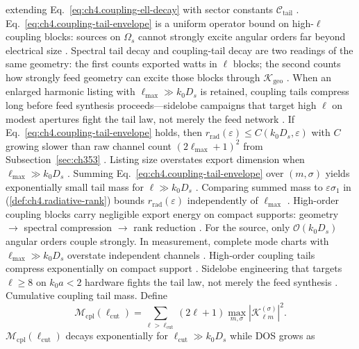 extending Eq.~\eqref{eq:ch4.coupling-ell-decay} with sector constants \(\mathcal{C}_{\mathrm{tail}}\)
\cite{hansen1988}. Eq.~\eqref{eq:ch4.coupling-tail-envelope} is a uniform operator bound on high-$\ell$ coupling blocks: sources on $\Omega_s$ cannot strongly excite angular orders far beyond electrical size \cite{harrington2001}.
Spectral tail decay and coupling-tail decay are two readings of the same geometry: the first counts exported watts in $\ell$ blocks; the second counts how strongly feed geometry can excite those blocks through $\boldsymbol{\mathcal{K}}_{\mathrm{geo}}$ \cite{hansen1988}. When an enlarged harmonic listing with $\ell_{\max}\gg k_0 D_s$ is retained, coupling tails compress long before feed synthesis proceeds---sidelobe campaigns that target high $\ell$ on modest apertures fight the tail law, not merely the feed network \cite{chu1948}.
\label{thm:ch4.coupling-tail-compression}
If Eq.~\eqref{eq:ch4.coupling-tail-envelope} holds, then
\(r_{\mathrm{rad}}(\varepsilon)\le C(k_{0}D_{s},\varepsilon)\) with \(C\) growing slower than raw channel count \((2\ell_{\max}+1)^{2}\)
from Subsection~\ref{sec:ch353} \cite{hansen1988}. Listing size overstates export dimension when
\(\ell_{\max}\gg k_{0}D_{s}\) \cite{devaney2004}.
Summing Eq.~\eqref{eq:ch4.coupling-tail-envelope} over \((m,\sigma)\) yields exponentially small tail mass for \(\ell\gg k_{0}D_{s}\)
\cite{hansen1988}. Comparing summed mass to \(\varepsilon\sigma_{1}\) in (\ref{def:ch4.radiative-rank}) bounds
\(r_{\mathrm{rad}}(\varepsilon)\) independently of \(\ell_{\max}\) \cite{harrington2001}.
High-order coupling blocks carry negligible export energy on compact supports: geometry $\to$ spectral compression $\to$ rank reduction \cite{hansen1988}. For the source, only $\mathcal{O}(k_{0}D_{s})$ angular orders couple strongly. In measurement, complete mode charts with $\ell_{\max}\gg k_{0}D_{s}$ overstate independent channels \cite{harrington2001}.
High-order coupling tails compress exponentially on compact support \cite{hansen1988}. Sidelobe engineering that targets $\ell\ge 8$ on $k_0 a<2$ hardware fights the tail law, not merely the feed synthesis \cite{stratton1941}.
Cumulative coupling tail mass. Define
\begin{equation}
\label{eq:ch4.coupling-tail-mass}
\mathcal{M}_{\mathrm{cpl}}(\ell_{\mathrm{cut}})=\sum_{\ell>\ell_{\mathrm{cut}}}(2\ell+1)\max_{m,\sigma}|\mathcal{K}_{\ell m}^{(\sigma)}|^{2}.
\end{equation}
\label{prop:ch4.coupling-tail-dos}
\(\mathcal{M}_{\mathrm{cpl}}(\ell_{\mathrm{cut}})\) decays exponentially for \(\ell_{\mathrm{cut}}\gg k_{0}D_{s}\) while DOS grows as
